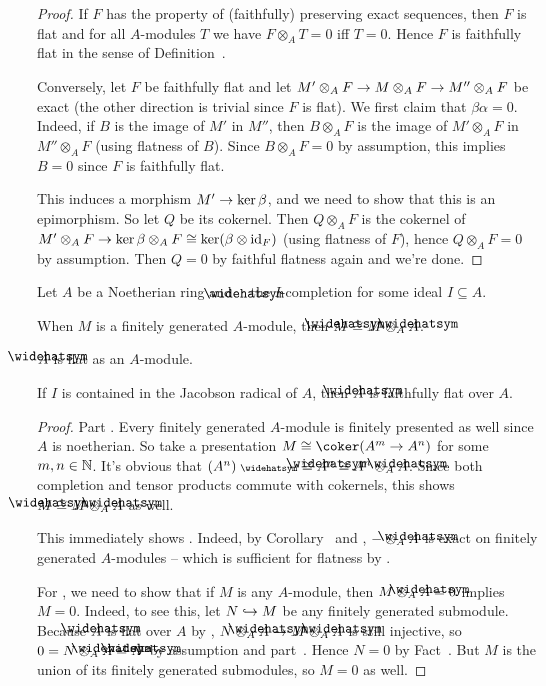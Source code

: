 \documentclass[a4paper,parskip=half,numbers=enddot, DIV=12]{scrreprt}
\begin{document}
\begin{proof}
	If $F$ has the property of (faithfully) preserving exact sequences, then $F$ is flat and for all $A$-modules $T$ we have $F\otimes_AT= 0$ iff $T=0$. Hence $F$ is faithfully flat in the sense of Definition~.
	
	Conversely, let $F$ be faithfully flat and let $M'\otimes_AF\morphism M\otimes_AF\morphism M''\otimes_AF$ be exact (the other direction is trivial since $F$ is flat). We first claim that $\beta\alpha=0$. Indeed, if $B$ is the image of $M'$ in $M''$, then $B\otimes_AF$ is the image of $M'\otimes_AF$ in $M''\otimes_AF$ (using flatness of $B$). Since $B\otimes_AF=0$ by assumption, this implies $B=0$ since $F$ is faithfully flat.
	
	This induces a morphism $M'\morphism\ker\beta$, and we need to show that this is an epimorphism. So let $Q$ be its cokernel. Then $Q\otimes_AF$ is the cokernel of $M'\otimes_AF\morphism\ker\beta\otimes_AF\cong \ker(\beta\otimes\id_F)$ (using flatness of $F$), hence $Q\otimes_AF=0$ by assumption. Then $Q=0$ by faithful flatness again and we're done.
\end{proof}
\begin{cor}
	Let $A$ be a Noetherian ring and $\roof{\phantom{x}}$ the $I$-completion for some ideal $I\subseteq A$.
	\begin{alphanumerate}
		\item When $M$ is a finitely generated $A$-module, then $\roof{M}\cong M\otimes_A\roof{A}$.
		\item $\roof{A}$ is flat as an $A$-module.
		\item If $I$ is contained in the Jacobson radical of $A$, then $\roof{A}$ is faithfully flat over $A$.
	\end{alphanumerate}
\end{cor}
\begin{proof}
	Part . Every finitely generated $A$-module is finitely presented as well since $A$ is noetherian. So take a presentation $M\cong \coker(A^m\morphism A^n)$ for some $m,n\in\mathbb{N}$. It's obvious that $(A^n)^\complete\cong \roof{A}^n\cong A^n\otimes_A\roof{A}$. Since both completion and tensor products commute with cokernels, this shows $\roof{M}\cong M\otimes_A\roof{A}$ as well.
	
	This immediately shows . Indeed, by Corollary~ and , $-\otimes_A\roof{A}$ is exact on finitely generated $A$-modules -- which is sufficient for flatness by \cite[Proposition~1.2.2]{homalg}.
	
	For , we need to show that if $M$ is any $A$-module, then $M\otimes_A\roof{A}=0$ implies $M=0$. Indeed, to see this, let $N\monomorphism M$ be any finitely generated submodule. Because $\roof{A}$ is flat over $A$ by , $N\otimes_A\roof{A}\morphism M\otimes_A\roof{A}$ is still injective, so $0=N\otimes_A\roof{A}=\roof{N}$ by assumption and part~. Hence $N=0$ by Fact~. But $M$ is the union of its finitely generated submodules, so $M=0$ as well.
\end{proof}
\end{document}
